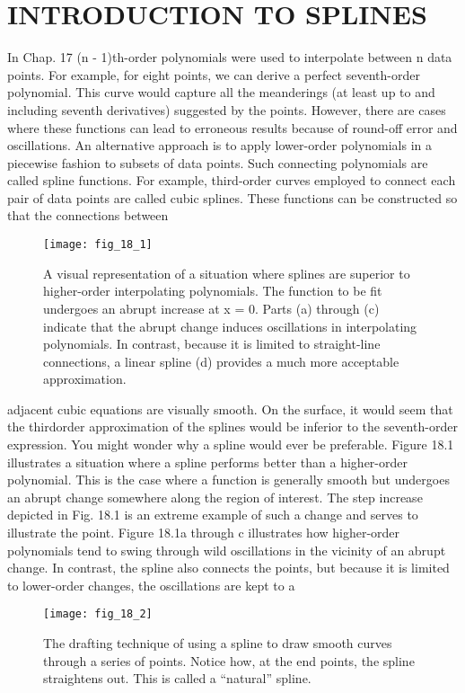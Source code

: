 \documentclass[../main.tex]{subfiles}
\begin{document}
\section{INTRODUCTION TO SPLINES}
In Chap. 17 (n - 1)th-order polynomials were used to interpolate between n data points.
For example, for eight points, we can derive a perfect seventh-order polynomial. This
curve would capture all the meanderings (at least up to and including seventh derivatives)
suggested by the points. However, there are cases where these functions can lead to erroneous results because of round-off error and oscillations. An alternative approach is to
apply lower-order polynomials in a piecewise fashion to subsets of data points. Such connecting polynomials are called spline functions.
For example, third-order curves employed to connect each pair of data points are
called cubic splines. These functions can be constructed so that the connections between
\begin{figure}[H]
    \centering
    \texttt{[image: fig\_18\_1]}
   \caption{\textsf{A visual representation of a situation where splines are superior to higher-order interpolating
   polynomials. The function to be fit undergoes an abrupt increase at x = 0. Parts (a) through (c)
   indicate that the abrupt change induces oscillations in interpolating polynomials. In contrast,
   because it is limited to straight-line connections, a linear spline (d) provides a much more
   acceptable approximation.}}\label{fig:fig_18_1}
\end{figure}
adjacent cubic equations are visually smooth. On the surface, it would seem that the thirdorder approximation of the splines would be inferior to the seventh-order expression. You
might wonder why a spline would ever be preferable.
Figure 18.1 illustrates a situation where a spline performs better than a higher-order
polynomial. This is the case where a function is generally smooth but undergoes an abrupt
change somewhere along the region of interest. The step increase depicted in Fig. 18.1 is
an extreme example of such a change and serves to illustrate the point.
Figure 18.1a through c illustrates how higher-order polynomials tend to swing through
wild oscillations in the vicinity of an abrupt change. In contrast, the spline also connects
the points, but because it is limited to lower-order changes, the oscillations are kept to a
\begin{figure}[H]
    \centering
    \texttt{[image: fig\_18\_2]}
   \caption{\textsf{The drafting technique of using a spline to draw smooth curves through a series of points. Notice
   how, at the end points, the spline straightens out. This is called a “natural” spline.}}\label{fig:fig_18_2}
\end{figure}
\end{document}

